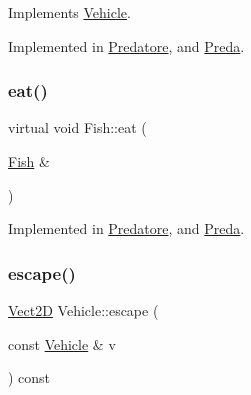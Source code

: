 Implements \hyperlink{classVehicle_a6c8513134608499d188a2e994accdb7c_a6c8513134608499d188a2e994accdb7c}{Vehicle}.



Implemented in \hyperlink{classPredatore_a493b41e7df1542c10cdd646559514917_a493b41e7df1542c10cdd646559514917}{Predatore}, and \hyperlink{classPreda_a12baf94e52873bf3b9a9a9da84c357c5_a12baf94e52873bf3b9a9a9da84c357c5}{Preda}.

\mbox{\label{classFish_ae551e094ddda73e896de484dcb460412_ae551e094ddda73e896de484dcb460412}} 
\subsubsection{\texorpdfstring{eat()}{eat()}}
{\footnotesize\ttfamily virtual void Fish\+::eat (\begin{DoxyParamCaption}\item[{\hyperlink{classFish}{Fish} \&}]{ }\end{DoxyParamCaption})\hspace{0.3cm}{\ttfamily [pure virtual]}}



Implemented in \hyperlink{classPredatore_a67da3e1eb33a3e27014acc9195d72d08_a67da3e1eb33a3e27014acc9195d72d08}{Predatore}, and \hyperlink{classPreda_ac7d83956cf08c9300d331a5505ab3118_ac7d83956cf08c9300d331a5505ab3118}{Preda}.

\mbox{\label{classVehicle_ae5fbf395cbebf51498cbe8b2baaddc16_ae5fbf395cbebf51498cbe8b2baaddc16}} 
\subsubsection{\texorpdfstring{escape()}{escape()}}
{\footnotesize\ttfamily \hyperlink{classVect2D}{Vect2D} Vehicle\+::escape (\begin{DoxyParamCaption}\item[{const \hyperlink{classVehicle}{Vehicle} \&}]{v }\end{DoxyParamCaption}) const\hspace{0.3cm}{\ttfamily [inherited]}}

\mbox{\label{classVehicle_ac7dbbb2942b8d642b2ab071def1c2fdb_ac7dbbb2942b8d642b2ab071def1c2fdb}} 
